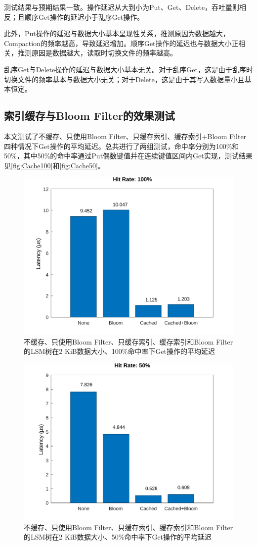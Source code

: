\documentclass[a4paper,UTF8]{ctexart}
\begin{document}
\par
测试结果与预期结果一致。操作延迟从大到小为Put、Get、Delete，吞吐量则相反；且顺序Get操作的延迟小于乱序Get操作。
\par
此外，Put操作的延迟与数据大小基本呈现性关系，推测原因为数据越大，Compaction的频率越高，导致延迟增加。顺序Get操作的延迟也与数据大小正相关，推测原因是数据越大，读取时切换文件的频率越高。
\par
乱序Get与Delete操作的延迟与数据大小基本无关。对于乱序Get，这是由于乱序时切换文件的频率基本与数据大小无关；对于Delete，这是由于其写入数据量小且基本恒定。

\subsection{索引缓存与Bloom Filter的效果测试}
本文测试了不缓存、只使用Bloom Filter、只缓存索引、缓存索引+Bloom Filter四种情况下Get操作的平均延迟。总共进行了两组测试，命中率分别为100\%和50\%，其中50\%的命中率通过Put偶数键值并在连续键值区间内Get实现，测试结果见\autoref{fig:Cache100}和\autoref{fig:Cache50}。

\begin{figure}[htbp]
	\centering
	\includegraphics[width=.6\textwidth]{cache-100.pdf}
	\caption{不缓存、只使用Bloom Filter、只缓存索引、缓存索引和Bloom Filter的LSM树在2 KiB数据大小、100\%命中率下Get操作的平均延迟}
	\label{fig:Cache100}
\end{figure}
\begin{figure}[htbp]
	\centering
	\includegraphics[width=.6\textwidth]{cache-50.pdf}
	\caption{不缓存、只使用Bloom Filter、只缓存索引、缓存索引和Bloom Filter的LSM树在2 KiB数据大小、50\%命中率下Get操作的平均延迟}
	\label{fig:Cache50}
\end{figure}
\end{document}
